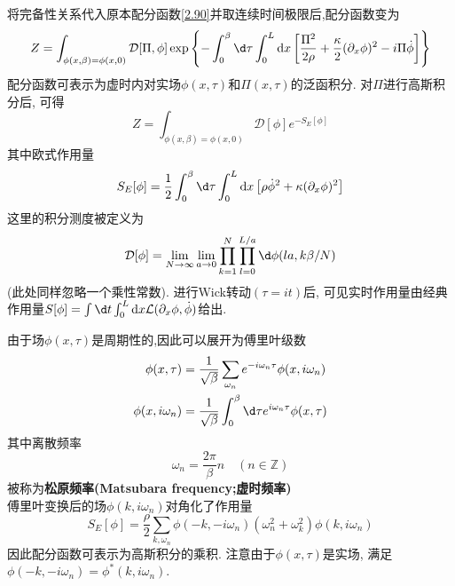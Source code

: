 将完备性关系代入原本配分函数\ref{2.90}并取连续时间极限后,配分函数变为
\begin{equation}
	Z=\int_{\phi(x,\beta)=\phi(x,0)}\mathcal{D}[\Pi,\phi]\exp\left\{-\int_0^\beta \d\tau\int_0^L\dx\left[\frac{\Pi^2}{2\rho}+\frac{\kappa}{2}(\partial_x\phi)^2-i\Pi\dot{\phi}\right]\right\}
\end{equation}
配分函数可表示为虚时内对实场$\phi(x,\tau)$和$\Pi(x,\tau)$的泛函积分. 对$\Pi$进行高斯积分后, 可得  
\begin{equation}
	Z=\int_{\phi(x,\beta)=\phi(x,0)}\mathcal{D}[\phi]e^{-S_E[\phi]}
\end{equation}
其中欧式作用量
\begin{equation}
	S_E[\phi]=\frac{1}{2}\int_0^\beta \d\tau\int_0^L\dx\left[\rho\dot{\phi}^2+\kappa(\partial_x\phi)^2\right]
\end{equation}
这里的积分测度被定义为
\begin{equation}
	\mathcal{D}[\phi]=\lim_{N\to\infty}\lim_{a\to0}\prod_{k=1}^N\prod_{l=0}^{L/a}\d\phi(la,k\beta/N)
\end{equation}
(此处同样忽略一个乘性常数). 进行Wick转动$(\tau=it)$后, 可见实时作用量由经典作用量$S[\phi]=\int \d t\int_0^L \dx\mathcal{L}(\partial_x\phi,\dot{\phi})$给出.  

由于场$\phi(x,\tau)$是周期性的,因此可以展开为傅里叶级数
\begin{equation}
	\begin{aligned}
		\phi(x,\tau)&=\frac{1}{\sqrt{\beta}}\sum_{\omega_n}e^{-i\omega_n\tau}\phi(x,i\omega_n)\\
		\phi(x,i\omega_n)&=\frac{1}{\sqrt{\beta}}\int_0^\beta \d\tau e^{i\omega_n\tau}\phi(x,\tau)
	\end{aligned}
\end{equation}
其中离散频率
\begin{equation}
	\omega_n=\frac{2\pi}{\beta}n\quad(n\in\mathbb{Z})
\end{equation}
被称为\textbf{松原频率(Matsubara frequency;虚时频率)}\\
傅里叶变换后的场$\phi(k,i\omega_n)$对角化了作用量
\begin{equation}
	S_E[\phi]=\frac{\rho}{2}\sum_{k,\omega_n}\phi(-k,-i\omega_n)\left(\omega_n^2+\omega_k^2\right)\phi(k,i\omega_n)
\end{equation}
因此配分函数可表示为高斯积分的乘积. 注意由于$\phi(x,\tau)$是实场, 满足$\phi(-k,-i\omega_n)=\phi^*(k,i\omega_n)$.  








